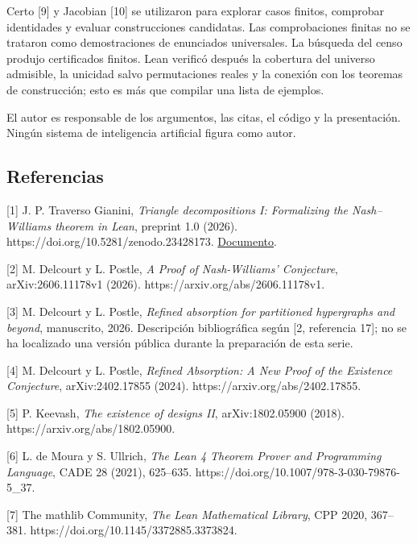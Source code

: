 \documentclass[spanish,11pt,a4paper]{article}
\begin{document}
Certo {[}9{]} y Jacobian {[}10{]} se utilizaron para explorar casos finitos, comprobar identidades y evaluar construcciones candidatas. Las comprobaciones finitas no se trataron como demostraciones de enunciados universales. La búsqueda del censo produjo certificados finitos. Lean verificó después la cobertura del universo admisible, la unicidad salvo permutaciones reales y la conexión con los teoremas de construcción; esto es más que compilar una lista de ejemplos.

El autor es responsable de los argumentos, las citas, el código y la presentación. Ningún sistema de inteligencia artificial figura como autor.


\clearpage
\subsection{Referencias}\label{referencias}

\begingroup\small\raggedright
\setlength{\parskip}{3pt}

{[}1{]} J. P. Traverso Gianini, \emph{Triangle decompositions I: Formalizing the Nash--Williams theorem in Lean}, preprint 1.0 (2026). https://doi.org/10.5281/zenodo.23428173. \href{https://github.com/jtraverso/nash-williams-triangle-decompositions-release/blob/main/preprints/PAPER_I/01_manuscript/PAPER_I_preprint_v1.0_es.md}{Documento}.

{[}2{]} M. Delcourt y L. Postle, \emph{A Proof of Nash-Williams' Conjecture}, arXiv:2606.11178v1 (2026). https://arxiv.org/abs/2606.11178v1.

{[}3{]} M. Delcourt y L. Postle, \emph{Refined absorption for partitioned hypergraphs and beyond}, manuscrito, 2026. Descripción bibliográfica según {[}2, referencia 17{]}; no se ha localizado una versión pública durante la preparación de esta serie.

{[}4{]} M. Delcourt y L. Postle, \emph{Refined Absorption: A New Proof of the Existence Conjecture}, arXiv:2402.17855 (2024). https://arxiv.org/abs/2402.17855.

{[}5{]} P. Keevash, \emph{The existence of designs II}, arXiv:1802.05900 (2018). https://arxiv.org/abs/1802.05900.

{[}6{]} L. de Moura y S. Ullrich, \emph{The Lean 4 Theorem Prover and Programming Language}, CADE 28 (2021), 625--635. https://doi.org/10.1007/978-3-030-79876-5\_37.

{[}7{]} The mathlib Community, \emph{The Lean Mathematical Library}, CPP 2020, 367--381. https://doi.org/10.1145/3372885.3373824.
\end{document}
